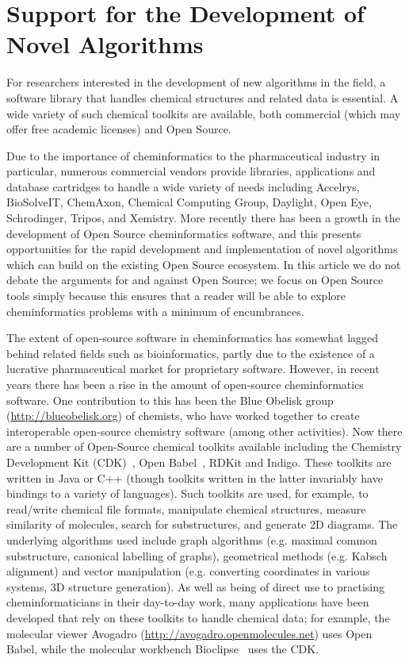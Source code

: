 \documentclass{sig-alternate}
\begin{document}
\section{Support for the Development of Novel Algorithms}
\label{sec:development-support}

For researchers interested in the development of new algorithms in the
field, a software library that handles chemical structures and related
data is essential. A wide variety of such chemical toolkits are
available, both commercial (which may offer free academic
licenses) and Open Source.

Due to the importance of cheminformatics to the pharmaceutical
industry in particular, numerous commercial vendors provide libraries,
applications and database cartridges to handle a wide variety of
needs including Accelrys, BioSolveIT, ChemAxon, Chemical Computing Group,
Daylight, Open Eye, Schrodinger, Tripos, and Xemistry. More recently
there has been a growth in the development of Open
Source cheminformatics software, and this presents opportunities for
the rapid development and implementation of novel algorithms which can
build on the existing Open Source ecosystem. In this article we do not debate the
arguments for and against Open Source; we focus on Open Source
tools simply because this ensures that a reader will be able to explore
cheminformatics problems with a minimum of encumbrances.

The extent of open-source software in cheminformatics has somewhat
lagged behind related fields such as bioinformatics, partly due to the
existence of a lucrative pharmaceutical market for proprietary
software. However, in recent years there has been a rise in the amount
of open-source cheminformatics software. One contribution to this has
been the Blue Obelisk group~\cite{BlueObelisk2011}
(\url{http://blueobelisk.org}) of chemists, who have worked together
to create interoperable open-source chemistry software (among other
activities). Now there are a number of Open-Source chemical toolkits
available including the Chemistry Development Kit
(CDK)~\cite{steinbeck2003}, Open Babel~\cite{openbabel2011}, RDKit and
Indigo. These toolkits are written in Java or C++ (though toolkits
written in the latter invariably have bindings to a variety of
languages). Such toolkits are used, for example, to read/write
chemical file formats, manipulate chemical structures, measure
similarity of molecules, search for substructures, and generate 2D
diagrams. The underlying algorithms used include graph algorithms
(e.g. maximal common substructure, canonical labelling of graphs),
geometrical methods (e.g. Kabsch alignment) and vector manipulation
(e.g. converting coordinates in various systems, 3D structure
generation). As well as being of direct use to practising
cheminformaticians in their day-to-day work, many applications have
been developed that rely on these toolkits to handle chemical data;
for example, the molecular viewer Avogadro
(\url{http://avogadro.openmolecules.net}) uses Open Babel, while the
molecular workbench Bioclipse~\cite{Bioclipse2} uses the CDK.
\end{document}

